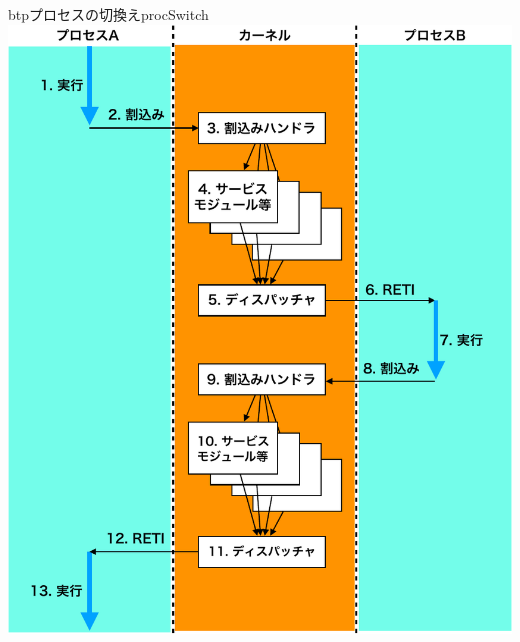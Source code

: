 \begin{myfig}{btp}{プロセスの切換え}{procSwitch}
  \includegraphics[scale=0.6]{Fig/procSwitch-crop.pdf}
\end{myfig}

